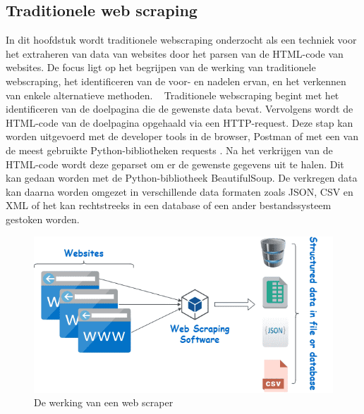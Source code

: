 \subsection{Traditionele web scraping}
In dit hoofdstuk wordt traditionele webscraping  onderzocht als een techniek voor het extraheren van data van websites door het parsen van de HTML-code van websites. De focus ligt op het begrijpen van de werking van traditionele webscraping, het identificeren van de voor- en nadelen ervan, en het verkennen van enkele alternatieve methoden.
~
Traditionele webscraping begint met het identificeren van de doelpagina die de gewenste data bevat. Vervolgens wordt de HTML-code van de doelpagina opgehaald via een HTTP-request. Deze stap kan worden uitgevoerd met de developer tools  in de browser, Postman of met een van de meest gebruikte Python-bibliotheken requests \autocite{Nate2023}.  Na het verkrijgen van de HTML-code wordt deze geparset om er de gewenste gegevens uit te halen. Dit kan gedaan worden met de Python-bibliotheek BeautifulSoup. De verkregen data kan daarna worden omgezet in verschillende data formaten zoals JSON, CSV en XML of het kan rechtstreeks  in een database of een ander bestandssysteem gestoken worden.
\begin{figure}[h]
    \includegraphics[width=\linewidth]{graphics/webscraping2.png}
    \caption{De werking van een web scraper \autocite{Kinsta2022}}
    \label{fig:webscraping}
\end{figure}

